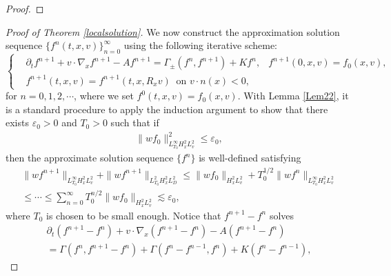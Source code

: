 \documentclass[reqno,a4paper]{amsart}
\numberwithin{equation}{section}
\newcommand{\1}{\mathbf{1}}
\newcommand{\ve}{\varepsilon}
\newcommand{\<}{\langle}
\renewcommand{\>}{\rangle}
\begin{document}
\begin{proof}

	\end{proof}

\begin{proof}[Proof of Theorem \ref{localsolution}]
	We now construct the approximation solution sequence $
		\{f^n(t,x,v)\}^\infty_{n=0}
	$ using the following iterative scheme:
	\begin{equation*}\left\{
		\begin{aligned}
			&\partial_tf^{n+1} + v\cdot \nabla_xf^{n+1} - A f^{n+1} = \Gamma_{\pm}(f^n,f^{n+1})+Kf^n,
			&f^{n+1}(0,x,v) = f_0(x,v),\\ 
			&{f^{n+1}}(t,x,v) = {f^{n+1}}(t,x,R_xv)\  \text{  on }v\cdot n(x)<0,
		\end{aligned}\right.
	\end{equation*}for $n=0,1,2,\cdots$, where we set $f^0(t,x,v)=f_0(x,v)$. 
	With Lemma \ref{Lem22}, it is a standard procedure to apply the induction argument to show that there exists $\ve_0>0$ and $T_0>0$ such that if 
	\begin{align*}
		\|{wf_0}\|^2_{L^\infty_{T_0}H^2_xL^2_v}\le \ve_0,
	\end{align*}
	then the approximate solution sequence $\{f^n\}$ is well-defined satisfying 
	\begin{multline*}
		\|wf^{n+1}\|_{L^\infty_{T_0}H^2_xL^2_v}+\|wf^{n+1}\|_{L^2_{T_0}H^2_{x}L^2_{D}}\le \|wf_0\|_{H^2_xL^2_v} + T_0^{1/2}\|wf^n\|_{L^\infty_{T_0}H^2_xL^2_v}\\\le\cdots\le \sum_{n=0}^\infty T_0^{n/2}\|wf_0\|_{H^2_xL^2_v}\lesssim \ve_0,
	\end{multline*}where $T_0$ is chosen to be small enough. 
	Notice that $f^{n+1}-f^n$ solves 
	\begin{multline*}
		\partial_t(f^{n+1}-f^n) + v\cdot \nabla_x(f^{n+1}-f^n)   
		- A (f^{n+1}-f^n)\\ = \Gamma(f^n,f^{n+1}-f^n)+\Gamma(f^n-f^{n-1},f^n)+K(f^n-f^{n-1}),

\end{multline*}
\end{proof}
\end{document}
